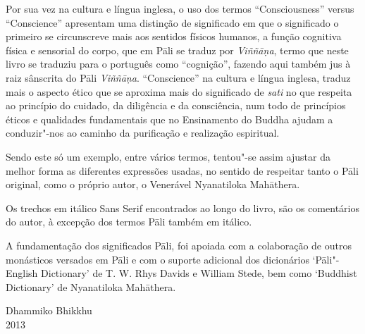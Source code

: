 Por sua vez na cultura e língua inglesa, o uso dos termos “Consciousness”
versus “Conscience” apresentam uma distinção de significado em que o
significado o primeiro se circunscreve mais aos sentidos físicos humanos, a
função cognitiva física e sensorial do corpo, que em Pāli se traduz por
\emph{Viññāṇa}, termo que neste livro se traduziu para o português como
“cognição”, fazendo aqui também jus à raiz sânscrita do Pāli \emph{Viññāṇa}.
“Conscience” na cultura e língua inglesa, traduz mais o aspecto ético que se
aproxima mais do significado de \emph{sati} no que respeita ao princípio do
cuidado, da diligência e da consciência, num todo de princípios éticos e
qualidades fundamentais que no Ensinamento do Buddha ajudam a conduzir"-nos ao
caminho da purificação e realização espiritual.

Sendo este só um exemplo, entre vários termos, tentou"-se assim ajustar da melhor
forma as diferentes expressões usadas, no sentido de respeitar tanto o Pāli
original, como o próprio autor, o Venerável Nyanatiloka Mahāthera.

Os trechos em itálico Sans Serif encontrados ao longo do livro, são os comentários
do autor, à excepção dos termos Pāli também em itálico.

A fundamentação dos significados Pāli, foi apoiada com a colaboração de outros
monásticos versados em Pāli e com o suporte adicional dos dicionários
‘Pāli"-English Dictionary’ de T. W. Rhys Davids e William Stede, bem como
‘Buddhist Dictionary’ de Nyanatiloka Mahāthera.

\bigskip

{\raggedleft
  Dhammiko Bhikkhu\\
  2013
\par}
